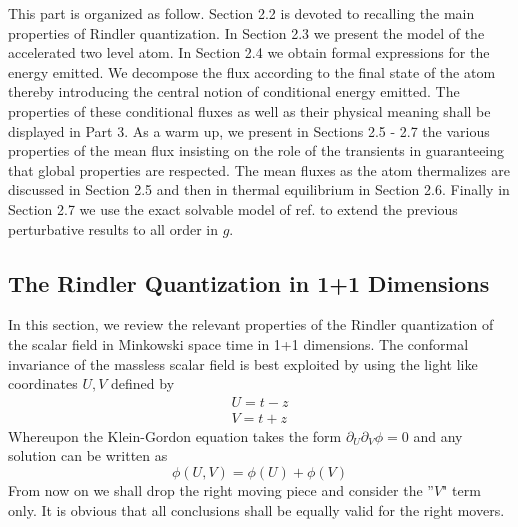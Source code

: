 \documentclass[12pt]{article}
\begin{document}
This part is organized as follow. Section 2.2 is devoted to recalling
the main properties of Rindler quantization. In Section 2.3 we present the
model of the accelerated two level atom. In Section 2.4  we obtain formal
expressions for the energy emitted.
We decompose the flux according to the
final state of the atom thereby introducing the central notion of conditional
energy emitted.  The
properties of these conditional fluxes
as well as their physical meaning shall be displayed in Part 3.
As a warm up,
we present in Sections 2.5 - 2.7
the various properties of the mean flux
 insisting on the role of the transients  in guaranteeing that
global properties are respected.
The mean fluxes as the atom thermalizes are discussed in Section 2.5 and then
in thermal equilibrium in Section 2.6. Finally in Section 2.7 we use the exact
solvable model of ref. \cite{RSG} to extend the previous perturbative
results to all order
in $g$.


\subsection{The Rindler Quantization in 1+1 Dimensions}

In this section, we review the relevant properties of the Rindler
quantization of the scalar field in Minkowski space time in 1+1 dimensions.
The conformal invariance of the massless scalar field is best
exploited by using the light like coordinates $U,V$ defined by
\begin{eqnarray}
U=t-z
\nonumber\\
V=t+z
\label{UV}
\end{eqnarray}
Whereupon the Klein-Gordon equation takes the form $\partial_U\partial_V \phi
= 0$ and any solution can be written as
\begin{equation} \phi(U,V) = \phi(U) + \phi(V) \label{threethreei}
\end{equation} From now on we shall drop the right moving piece and consider
the ''$V$" term only. It is
obvious that all conclusions shall be equally valid
for
the
right
movers.
\end{document}
